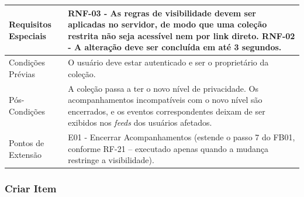 \begin{longtable}{ >{\raggedright}p{2.8cm} | >{\raggedright\arraybackslash}p{10.7cm} }
Requisitos Especiais & RNF-03 - As regras de visibilidade devem ser aplicadas no servidor, de modo que uma coleção restrita não seja acessível nem por link direto. RNF-02 - A alteração deve ser concluída em até 3 segundos. \\ \hline

Condições Prévias & O usuário deve estar autenticado e ser o proprietário da coleção. \\ \hline

Pós-Condições & A coleção passa a ter o novo nível de privacidade. Os acompanhamentos incompatíveis com o novo nível são encerrados, e os eventos correspondentes deixam de ser exibidos nos \textit{feeds} dos usuários afetados. \\ \hline

Pontos de Extensão & E01 - Encerrar Acompanhamentos (estende o passo 7 do FB01, conforme RF-21 -- executado apenas quando a mudança restringe a visibilidade). \\
\end{longtable}
\renewcommand{\arraystretch}{1}
\FloatBarrier


\subsubsection{Criar Item}

